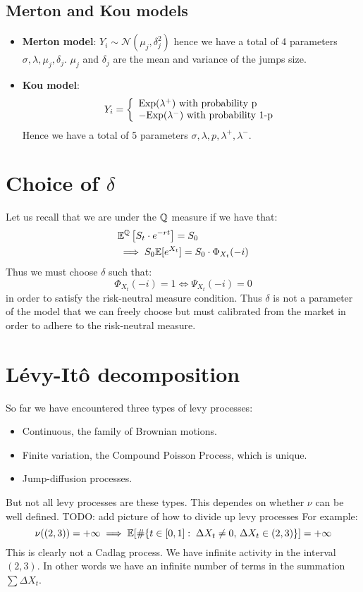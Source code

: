 \subsection*{Merton and Kou models}
\begin{itemize}
    \item \textbf{Merton model}: $Y_i \sim \mathcal{N}(\mu_j, \delta_j^2)$ hence
        we have a total of 4 parameters $\sigma, \lambda, \mu_j, \delta_j$.
        $\mu_j$ and $\delta_j$ are the mean and variance of the jumps size.
    \item \textbf{Kou model}:
        \[
            Y_i = \left\{ \begin{array}{l}
                    \text{Exp}(\lambda^+) \text{ with probability }
                    $p$ \\
                    -\text{Exp}(\lambda^-) \text{ with probability }
                    $1-p$
                \end{array} \right.
        \]
        Hence we have a total of 5 parameters $\sigma, \lambda, p, \lambda^+,
        \lambda^-$.
\end{itemize}

\section{Choice of \texorpdfstring{$\delta$}{delta}}
Let us recall that we are under the $\mathbb{Q}$ measure if we have that:
\begin{align*}
    & \mathbb{E}^{\mathbb{Q}} \left[ S_t \cdot e^{-rt} \right] = S_0 \\
    & \implies S_0 \mathbb{E}[e^{X_t}] = S_0 \cdot \Phi_{X_t}(-i)
\end{align*}
Thus we must choose $\delta$ such that:
\[ \Phi_{X_t}(-i) = 1 \iff \Psi_{X_t}(-i) = 0 \]
in order to satisfy the risk-neutral measure condition. Thus $\delta$ is not a
parameter of the model that we can freely choose but must calibrated from the
market in order to adhere to the risk-neutral measure.

\section{Lévy-Itô decomposition}
So far we have encountered three types of levy processes:
\begin{itemize}
    \item Continuous, the family of Brownian motions.
    \item Finite variation, the Compound Poisson Process, which is unique.
    \item Jump-diffusion processes.
\end{itemize}
But not all levy processes are these types. This dependes on whether $\nu$ can
be well defined.
TODO: add picture of how to divide up levy processes
For example:
\[ \nu((2,3)) = +\infty \implies \mathbb{E} [ \# \{ t\in[0,1]: \; \Delta X_t \neq 0, \,
    \Delta X_t \in (2,3) \} ] = +\infty \]
This is clearly not a Cadlag process. We have infinite activity in the interval
$(2,3)$. In other words we have an infinite number of terms in the summation
$\sum \Delta X_t$.

